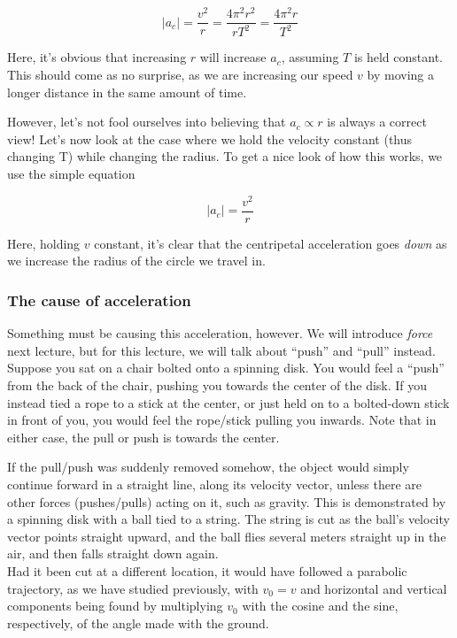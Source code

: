 \begin{equation}
|a_c| = \frac{v^2}{r} = \frac{4 \pi^2 r^2}{r T^2} = \frac{4 \pi^2 r}{T^2}
\end{equation}

Here, it's obvious that increasing $r$ will increase $a_c$, assuming $T$ is held constant. This should come as no surprise, as we are increasing our speed $v$ by moving a longer distance in the same amount of time.

However, let's not fool ourselves into believing that $a_c \propto r$ is always a correct view! Let's now look at the case where we hold the velocity constant (thus changing T) while changing the radius. To get a nice look of how this works, we use the simple equation

\begin{equation}
|a_c| = \frac{v^2}{r}
\end{equation}

Here, holding $v$ constant, it's clear that the centripetal acceleration goes \emph{down} as we increase the radius of the circle we travel in.

\subsubsection{The cause of acceleration}

Something must be causing this acceleration, however. We will introduce \emph{force} next lecture, but for this lecture, we will talk about ``push'' and ``pull'' instead. Suppose you sat on a chair bolted onto a spinning disk. You would feel a ``push'' from the back of the chair, pushing you towards the center of the disk. If you instead tied a rope to a stick at the center, or just held on to a bolted-down stick in front of you, you would feel the rope/stick pulling you inwards. Note that in either case, the pull or push is towards the center.

If the pull/push was suddenly removed somehow, the object would simply continue forward in a straight line, along its velocity vector, unless there are other forces (pushes/pulls) acting on it, such as gravity. This is demonstrated by a spinning disk with a ball tied to a string. The string is cut as the ball's velocity vector points straight upward, and the ball flies several meters straight up in the air, and then falls straight down again.\\
Had it been cut at a different location, it would have followed a parabolic trajectory, as we have studied previously, with $v_0 = v$ and horizontal and vertical components being found by multiplying $v_0$ with the cosine and the sine, respectively, of the angle made with the ground.

